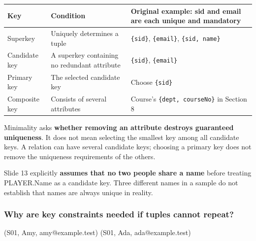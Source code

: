 \begin{longtable}[]{@{}
  >{\raggedright\arraybackslash}p{}
  >{\raggedright\arraybackslash}p{}
  >{\raggedright\arraybackslash}p{}@{}}
\toprule\noalign{}
\begin{minipage}[b]{\linewidth}\raggedright
Key
\end{minipage} & \begin{minipage}[b]{\linewidth}\raggedright
Condition
\end{minipage} & \begin{minipage}[b]{\linewidth}\raggedright
Original example: sid and email are each unique and mandatory
\end{minipage} \\
\midrule\noalign{}
\endhead
\bottomrule\noalign{}
\endlastfoot
Superkey & Uniquely determines a tuple & \texttt{\{sid\}}, \texttt{\{email\}}, \texttt{\{sid,\ name\}} \\
Candidate key & A superkey containing no redundant attribute & \texttt{\{sid\}}, \texttt{\{email\}} \\
Primary key & The selected candidate key & Choose \texttt{\{sid\}} \\
Composite key & Consists of several attributes & Course's \texttt{\{dept,\ courseNo\}} in Section 8 \\
\end{longtable}

Minimality asks \textbf{whether removing an attribute destroys guaranteed uniqueness}. It does not mean selecting the smallest key among all candidate keys. A relation can have several candidate keys; choosing a primary key does not remove the uniqueness requirements of the others.

Slide 13 explicitly \textbf{assumes that no two people share a name} before treating PLAYER.Name as a candidate key. Three different names in a sample do not establish that names are always unique in reality.

\subsubsection{Why are key constraints needed if tuples cannot repeat?}\label{03_relational_model_and_integrity_en-why-are-key-constraints-needed-if-tuples-cannot-repeat}

\begin{StudyCode}
(S01, Amy, amy@example.test)
(S01, Ada, ada@example.test)
\end{StudyCode}

